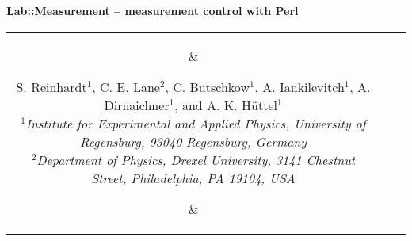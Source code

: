 \documentclass[portrait]{a0poster}
\begin{document}
\color{text}
\Large
%
\newlength{\seplength}
\newlength{\headerheight}
\newlength{\columnheight}
\newlength{\columnheighta}
\newlength{\columnheightb}
%
\setlength{\columnheight}{104cm}           %
\setlength{\columnheighta}{\columnheight-6cm}
\setlength{\columnheightb}{\columnheight+6.5cm}
\setlength{\columnwidth}{0.31\textwidth}   %
%
\setlength{\fboxsep}{10mm}
\setlength{\fboxrule}{0mm}
%
%
%
%
\hspace*{-1cm}\begin{minipage}[t][][t]{\textwidth-2\fboxsep-8\fboxrule}
\color{invheading}
\begin{center}
{
\VERYHuge \vspace*{-0.6cm}
\textsf{\textbf{
Lab::Measurement -- measurement control with Perl
}}
}
\\[\baselineskip]
\begin{tabular}{ccc}
\parbox{5cm}{\vspace*{-1cm}
\begin{center}
\end{center}
}
&
\parbox{70cm}{
\begin{center} 
{
\vspace*{-0.5cm}
\huge 
S. Reinhardt$^1$, C. E. Lane$^2$, C. Butschkow$^1$, A. Iankilevitch$^1$, A. 
Dirnaichner$^1$, 
and A. K. Hüttel$^1$
}
\\[\medskipamount]
\it 
\Large
$^1$Institute for Experimental and Applied
Physics, University of Regensburg, 93040 Regensburg, Germany\\
$^2$Department of Physics, Drexel University, 3141 Chestnut Street, 
Philadelphia, PA 19104, USA\\
\end{center}
\vspace*{0.5cm}
}
&
\parbox{5cm}{\vspace*{-1cm}
\begin{center}
\end{center}
}
\end{tabular}
\end{center}
\end{minipage}
\vspace*{9mm}
\end{document}
